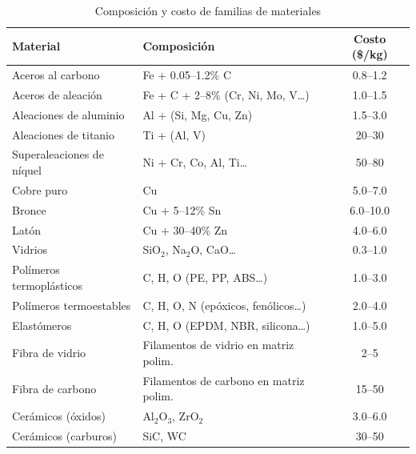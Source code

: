 \begin{table}[h!]
  \centering
  \small
  \caption{Composición y costo de familias de materiales}
  \label{tab:prop_mat_comp_costo}
  \begin{tabular}{@{} l l c @{}}
    \toprule
    Material                  & Composición                          & Costo (\$/kg) \\
    \midrule
    Aceros al carbono         & Fe + 0.05–1.2\% C                    & 0.8–1.2       \\
    Aceros de aleación        & Fe + C + 2–8\% (Cr, Ni, Mo, V…)      & 1.0–1.5       \\
    Aleaciones de aluminio    & Al + (Si, Mg, Cu, Zn)                & 1.5–3.0       \\
    Aleaciones de titanio     & Ti + (Al, V)                         & 20–30         \\
    Superaleaciones de níquel & Ni + Cr, Co, Al, Ti…                 & 50–80         \\
    Cobre puro                & Cu                                   & 5.0–7.0       \\
    Bronce                    & Cu + 5–12\% Sn                       & 6.0–10.0      \\
    Latón                     & Cu + 30–40\% Zn                      & 4.0–6.0       \\
    Vidrios                   & SiO$_2$, Na$_2$O, CaO…               & 0.3–1.0       \\
    Polímeros termoplásticos  & C, H, O (PE, PP, ABS…)               & 1.0–3.0       \\
    Polímeros termoestables   & C, H, O, N (epóxicos, fenólicos…)    & 2.0–4.0       \\
    Elastómeros               & C, H, O (EPDM, NBR, silicona…)       & 1.0–5.0       \\
    Fibra de vidrio           & Filamentos de vidrio en matriz polim. & 2–5           \\
    Fibra de carbono          & Filamentos de carbono en matriz polim. & 15–50         \\
    Cerámicos (óxidos)        & Al$_2$O$_3$, ZrO$_2$                 & 3.0–6.0       \\
    Cerámicos (carburos)      & SiC, WC                              & 30–50         \\
    \bottomrule
  \end{tabular}
\end{table}

